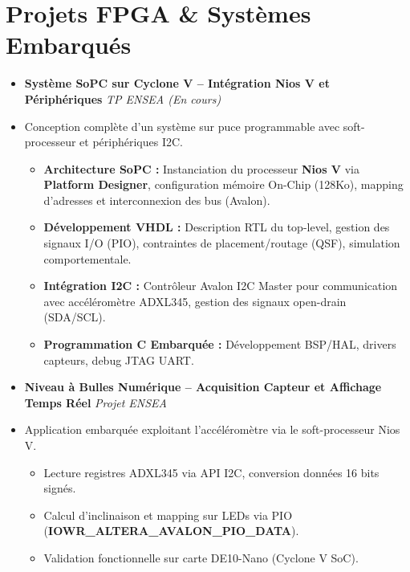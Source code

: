 \documentclass[a4paper,11pt]{article}
\begin{document}
\section{Projets FPGA \& Systèmes Embarqués}
\begin{itemize}[leftmargin=*, label={}]

\item \textbf{Système SoPC sur Cyclone V -- Intégration Nios V et Périphériques} \hfill \textit{TP ENSEA (En cours)}
\vspace{-2pt}
\item \small{Conception complète d'un système sur puce programmable avec soft-processeur et périphériques I2C.}
    \begin{itemize}[leftmargin=0.4cm, nosep, label=\tiny$\bullet$]
        \item \small{\textbf{Architecture SoPC :} Instanciation du processeur \textbf{Nios V} via \textbf{Platform Designer}, configuration mémoire On-Chip (128Ko), mapping d'adresses et interconnexion des bus (Avalon).}
        \item \small{\textbf{Développement VHDL :} Description RTL du top-level, gestion des signaux I/O (PIO), contraintes de placement/routage (QSF), simulation comportementale.}
        \item \small{\textbf{Intégration I2C :} Contrôleur Avalon I2C Master pour communication avec accéléromètre ADXL345, gestion des signaux open-drain (SDA/SCL).}
        \item \small{\textbf{Programmation C Embarquée :} Développement BSP/HAL, drivers capteurs, debug JTAG UART.}
    \end{itemize}
    \vspace{3pt}

\item \textbf{Niveau à Bulles Numérique -- Acquisition Capteur et Affichage Temps Réel} \hfill \textit{Projet ENSEA}
\vspace{-2pt}
\item \small{Application embarquée exploitant l'accéléromètre via le soft-processeur Nios V.}
    \begin{itemize}[leftmargin=0.4cm, nosep, label=\tiny$\bullet$]
        \item \small{Lecture registres ADXL345 via API I2C, conversion données 16 bits signés.}
        \item \small{Calcul d'inclinaison et mapping sur LEDs via PIO (\textbf{IOWR\_ALTERA\_AVALON\_PIO\_DATA}).}
        \item \small{Validation fonctionnelle sur carte DE10-Nano (Cyclone V SoC).}
    \end{itemize}
    \vspace{3pt}


\end{itemize}
\end{document}
